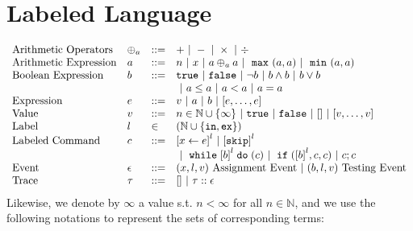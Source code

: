 \section{Labeled Language}
\label{sec:language-syntax}
\[
\begin{array}{llll}
\mbox{Arithmetic Operators} 
& \oplus_a & ::= & + ~|~ - ~|~ \times 
%
~|~ \div
\\  
\mbox{Arithmetic Expression} 
& \aexpr & ::= & 
n ~|~ {x} ~|~ \aexpr \oplus_a \aexpr  ~|~ \emax (a, a) ~|~ \emin(a, a)
\\
\mbox{Boolean Expression} & \bexpr & ::= & 
%
\etrue ~|~ \efalse  ~|~ \neg \bexpr
 ~|~ \bexpr \land \bexpr
%
~|~ \bexpr \lor \bexpr 
\\
& & &
~|~ \aexpr \leq \aexpr 
~|~ \aexpr < \aexpr 
~|~ \aexpr = \aexpr 
\\
\mbox{Expression} & \expr & ::= & v ~|~ \aexpr ~|~ \bexpr ~|~ [\expr, \dots, \expr]
\\  
%
\mbox{Value} 
& v & ::= & { n \in \mathbb{N} \cup \{\infty\} ~|~ \etrue ~|~ \efalse ~|~ [] ~|~ [v, \dots, v]} \\
%
\mbox{Label} 
& l & \in & (\mathbb{N} \cup \{\lin, \lex\}) 
\\ 
%
\mbox{Labeled Command} 
& {c} & ::= &  
\clabel{\assign{x}{\expr}}^l 
~|~  \clabel{\eskip}^l 
\\
& & &
~|~ \ewhile \clabel{\bexpr}^{l} \edo ({c})
~|~ \eif(\clabel{\bexpr}^{l} , {c}, {c}) 
~|~ {c};{c}  
\\ 
\mbox{Event} 
& \event & ::= & 
({x}, l, v) ~ \mbox{Assignment Event} 
~|~(\bexpr, l, v) ~ \mbox{Testing Event}
\\
\mbox{Trace} & \trace
& ::= & [] ~|~ \trace :: \event
\\
\end{array}
\]
Likewise, we denote by $\infty$ a value s.t. $n < \infty $ for all $n \in \mathbb{N}$, and we use the following notations to represent the sets of corresponding terms:
